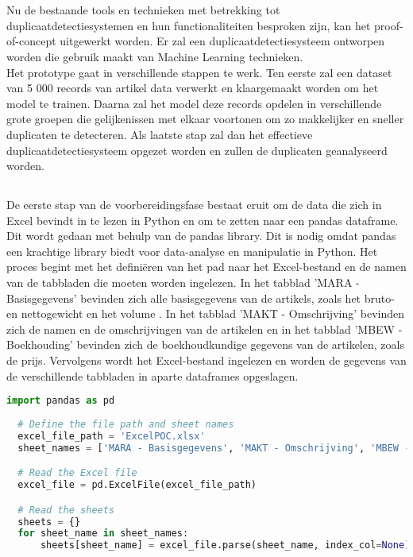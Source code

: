 
\chapter{}%
\label{ch:ProofOfConcept}

Nu de bestaande tools en technieken met betrekking tot duplicaatdetectiesystemen en hun functionaliteiten besproken zijn, kan het proof-of-concept uitgewerkt worden. Er zal een duplicaatdetectiesysteem ontworpen worden die gebruik maakt van Machine Learning technieken.
\\Het prototype gaat in verschillende stappen te werk. Ten eerste zal een dataset van 5 000 records van artikel data verwerkt en klaargemaakt worden om het model te trainen. Daarna zal het model deze records opdelen in verschillende grote groepen die gelijkenissen met elkaar voortonen om zo makkelijker en sneller duplicaten te detecteren. Als laatste stap zal dan het effectieve duplicaatdetectiesysteem opgezet worden en zullen de duplicaten geanalyseerd worden.

\section{}%
\label{sec:dataPreparatiePOC}

De eerste stap van de voorbereidingsfase bestaat eruit om de data die zich in Excel bevindt in te lezen in Python en om te zetten naar een pandas dataframe. Dit wordt gedaan met behulp van de pandas library. Dit is nodig omdat pandas een krachtige library biedt voor data-analyse en manipulatie in Python. Het proces begint met het definiëren van het pad naar het Excel-bestand en de namen van de tabbladen die moeten worden ingelezen. In het tabblad 'MARA - Basisgegevens' bevinden zich alle basisgegevens van de artikels, zoals het bruto- en nettogewicht en het volume . In het tabblad 'MAKT - Omschrijving' bevinden zich de namen en de omschrijvingen van de artikelen en in het tabblad 'MBEW - Boekhouding' bevinden zich de boekhoudkundige gegevens van de artikelen, zoals de prijs. Vervolgens wordt het Excel-bestand ingelezen en worden de gegevens van de verschillende tabbladen in aparte dataframes opgeslagen.
\begin{lstlisting}[language=Python, caption={Inlezen van Excel-gegevens in pandas dataframes}]
  import pandas as pd
  
  # Define the file path and sheet names
  excel_file_path = 'ExcelPOC.xlsx'
  sheet_names = ['MARA - Basisgegevens', 'MAKT - Omschrijving', 'MBEW - Boekhouding']

  # Read the Excel file
  excel_file = pd.ExcelFile(excel_file_path)

  # Read the sheets
  sheets = {}
  for sheet_name in sheet_names:
      sheets[sheet_name] = excel_file.parse(sheet_name, index_col=None)
\end{lstlisting}

